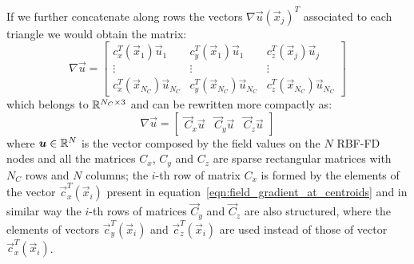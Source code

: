 If we further concatenate along rows the vectors $\nabla \vec{u}(\vec{x}_j)^T$ associated to each triangle we would obtain the matrix:
\begin{equation}
	\label{eqn:field_gradient_at_centroids}
		\nabla \vec{u} =
			\begin{bmatrix}
				c_x^T(\vec{x}_1) \vec{u}_1  &  c_y^T(\vec{x}_1) \vec{u}_1  &  c_z^T(\vec{x}_j) \vec{u}_j  							\\
				\vdots						& \vdots					   & \vdots													\\
				c_x^T(\vec{x}_{N_C}) \vec{u}_{N_C}  &  c_y^T(\vec{x}_{N_C}) \vec{u}_{N_C}  &  c_z^T(\vec{x}_{N_C}) \vec{u}_{N_C}
			\end{bmatrix}
\end{equation}
which belongs to $\mathbb{R}^{N_C \times 3}$ and can be rewritten more compactly as:
\begin{equation}
	\nabla \vec{u} =
	\begin{bmatrix}
		\vec{C}_x \vec{u}  &  \vec{C}_y \vec{u}  &  \vec{C}_z \vec{u}
	\end{bmatrix}
\end{equation}
where $\boldsymbol{u} \in \mathbb{R}^{N}$ is the vector composed by the field values on the $N$ RBF-FD nodes and all the matrices $C_x$, $C_y$ and $C_z$ are sparse rectangular matrices with $N_C$ rows and $N$ columns; the $i$-th row of matrix $C_x$ is formed by the elements of the vector $\vec{c}_x^T(\vec{x}_i)$ present in equation~\eqref{eqn:field_gradient_at_centroids} and in similar way the $i$-th rows of matrices $\vec{C}_y$ and $\vec{C}_z$ are also structured, where the elements of vectors $\vec{c}_y^T(\vec{x}_i)$ and $\vec{c}_z^T(\vec{x}_i)$ are used instead of those of vector $\vec{c}_x^T(\vec{x}_i)$.

